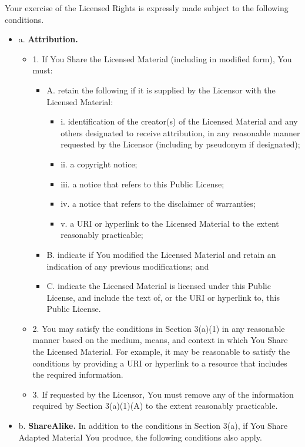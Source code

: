 Your exercise of the Licensed Rights is expressly made subject to the following conditions.
	\begin{itemize}
		\item a. \textbf{Attribution.}
			\begin{itemize}
				\item 1. If You Share the Licensed Material (including in modified form), You must:
					\begin{itemize}
						\item A. retain the following if it is supplied by the Licensor with the Licensed Material: 
							\begin{itemize}
								\item i. identification of the creator(s) of the Licensed Material and any others designated to receive attribution, in any reasonable manner requested by the Licensor (including by pseudonym if designated);
								\item ii. a copyright notice;
								\item iii. a notice that refers to this Public License;
								\item iv. a notice that refers to the disclaimer of warranties;
								\item v. a URI or hyperlink to the Licensed Material to the extent reasonably practicable;
							\end{itemize}
						\item B. indicate if You modified the Licensed Material and retain an indication of any previous modifications; and
						\item C.     indicate the Licensed Material is licensed under this Public License, and include the text of, or the URI or hyperlink to, this Public License.
					\end{itemize}
				\item 2. You may satisfy the conditions in Section 3(a)(1) in any reasonable manner based on the medium, means, and context in which You Share the Licensed Material. For example, it may be reasonable to satisfy the conditions by providing a URI or hyperlink to a resource that includes the required information.
				\item 3. If requested by the Licensor, You must remove any of the information required by Section 3(a)(1)(A) to the extent reasonably practicable.
			\end{itemize}
		\item b. \textbf{ShareAlike.} In addition to the conditions in Section 3(a), if You Share Adapted Material You produce, the following conditions also apply.

\end{itemize}
